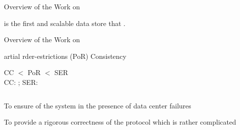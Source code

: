 
\begin{frame}{Overview of the Work on \unistore}
  \begin{center}
    \vspace{0.20cm}

    \vspace{1.00cm}
    \unistore{} is the first  and scalable  data store
    that .
  \end{center}
\end{frame}

\begin{frame}{Overview of the Work on \unistore}
  \begin{center}
    {artial rder-estrictions (PoR) Consistency}

    \vspace{0.30cm}
    CC $<$ PoR $<$ SER \\[6pt]
    CC: \cc; SER: \ser

    \pause
    \vspace{1.00cm}
    \begin{columns}
      \begin{description}[Challenges (II):]
        \setlength{\itemsep}{8pt}
        \item[Challenges (I):] To ensure  of the system in the presence of data
          center failures
        \item[Challenges (II):] To provide a rigorous correctness  of the protocol
          which is rather complicated
      \end{description}
    \end{columns}
  \end{center}
\end{frame}

